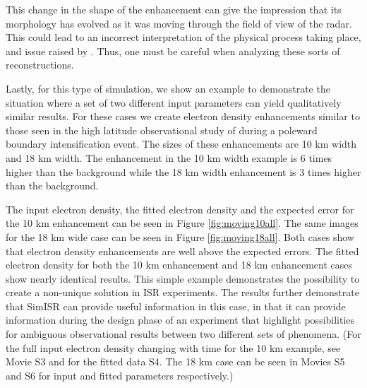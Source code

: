 \documentclass[draft,ras]{agutex}
\begin{document}
\begin{article}
This change in the shape of the enhancement can give the impression that its morphology has evolved as it was moving through the field of view of the radar. This could lead to an incorrect interpretation of the physical process taking place, and issue raised by \citet{Dahlgren:2012dq}.   Thus, one must be careful when analyzing these sorts of reconstructions.

Lastly, for this type of simulation, we show an example to demonstrate the situation where a set of two different input parameters can yield qualitatively similar results. For these cases we create electron density enhancements similar to those seen in the high latitude observational study of \citet{Semeter:2005fo} during a poleward boundary intensification event. The sizes of these enhancements are 10 km width and 18 km width. The enhancement in the 10 km width example is 6 times higher than the background while the 18 km width enhancement is 3 times higher than the background.

The input electron density, the fitted electron density and the expected error for the 10 km enhancement can be seen in Figure \ref{fig:moving10all}. The same images for the 18 km wide case can be seen in Figure \ref{fig:moving18all}. Both cases show that electron density enhancements are well above the expected errors.
The fitted electron density for both the 10 km enhancement and 18 km enhancement cases show nearly identical results. This simple example demonstrates the possibility to create a non-unique solution in ISR experiments. The results further demonstrate that SimISR can provide useful information in this case, in that it can provide information during the design phase of an experiment that highlight possibilities for ambiguous observational results between two different sets of phenomena. (For the full input electron density changing with time for the 10 km example, see Movie S3 and for the fitted data S4. The 18 km case can be seen in Movies S5 and S6 for input and fitted parameters respectively.)


\end{article}
\end{document}

